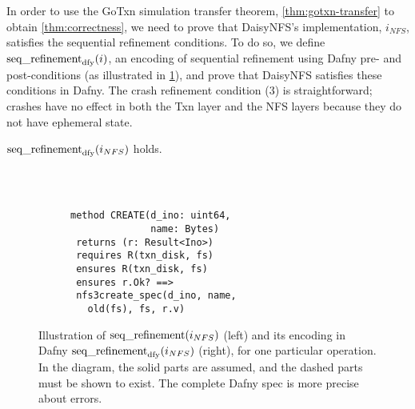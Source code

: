 In order to use the GoTxn simulation transfer theorem, \cref{thm:gotxn-transfer} to obtain \cref{thm:correctness}, we need to
prove that DaisyNFS's implementation, $i_{NFS}$, satisfies the sequential refinement conditions. To do so, we define
$\operatorname{seq\_refinement}_{\mathrm{dfy}}(i)$, an encoding of sequential refinement
using Dafny pre- and post-conditions (as illustrated in \cref{fig:refinement}), and prove that DaisyNFS
satisfies these conditions in Dafny. The crash refinement condition (3) is
straightforward; crashes have no effect in both the Txn layer and the NFS layers
because they do not have ephemeral state.

\begin{theorem} $\operatorname{seq\_refinement}_{\mathrm{dfy}}(i_{NFS})$ holds.
  \label{thm:dafny}
\end{theorem}

\begin{figure}
  \centering
  \begin{subfigure}{0.25\textwidth}
    
  \end{subfigure}~~~\vrule~~~~%
\begin{subfigure}{0.3\textwidth}
  {\small
\begin{verbatim}

method CREATE(d_ino: uint64,
              name: Bytes)
 returns (r: Result<Ino>)
 requires R(txn_disk, fs)
 ensures R(txn_disk, fs)
 ensures r.Ok? ==>
 nfs3create_spec(d_ino, name,
   old(fs), fs, r.v)
\end{verbatim}
}
\end{subfigure}
  \caption{Illustration of $\operatorname{seq\_refinement}(i_{NFS})$ (left) and its encoding
in Dafny $\operatorname{seq\_refinement}_{\mathrm{dfy}}(i_{NFS})$ (right), for one particular operation.
In the diagram, the solid parts are assumed, and the
dashed parts must be shown to exist. The complete Dafny spec is more precise about
errors.}
  \label{fig:refinement}
\end{figure}

